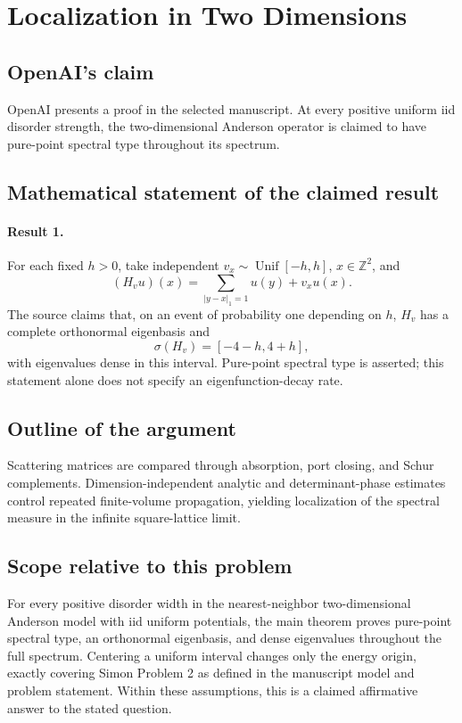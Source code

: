 \documentclass[11pt]{article}
\begin{document}
\section*{Localization in Two Dimensions}

\subsection{OpenAI's claim}
OpenAI presents a proof in the selected manuscript. At every positive uniform iid disorder strength, the two-dimensional Anderson operator is claimed to have pure-point spectral type throughout its spectrum.

\subsection{Mathematical statement of the claimed result}
\paragraph{Result 1.} For each fixed \(h>0\), take independent \(v_x\sim\operatorname{Unif}[-h,h]\), \(x\in\mathbb Z^2\), and
\[
 (H_vu)(x)=\sum_{|y-x|_1=1}u(y)+v_xu(x).
\]
The source claims that, on an event of probability one depending on \(h\), \(H_v\) has a complete orthonormal eigenbasis and
\[
 \sigma(H_v)=[-4-h,4+h],
\]
with eigenvalues dense in this interval. Pure-point spectral type is asserted; this statement alone does not specify an eigenfunction-decay rate.

\subsection{Outline of the argument}
Scattering matrices are compared through absorption, port closing, and Schur complements. Dimension-independent analytic and determinant-phase estimates control repeated finite-volume propagation, yielding localization of the spectral measure in the infinite square-lattice limit.

\subsection{Scope relative to this problem}
For every positive disorder width in the nearest-neighbor two-dimensional Anderson model with iid uniform potentials, the main theorem proves pure-point spectral type, an orthonormal eigenbasis, and dense eigenvalues throughout the full spectrum. Centering a uniform interval changes only the energy origin, exactly covering Simon Problem 2 as defined in the manuscript model and problem statement. Within these assumptions, this is a claimed affirmative answer to the stated question.
\end{document}
